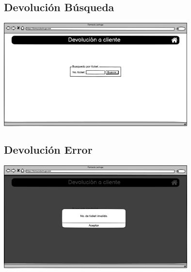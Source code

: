 \begin{flushleft}
	\subsection{Devolución Búsqueda} \label{UI: devolucion busqueda}
	\begin{center}
		\includegraphics[width=10cm]{pantallas/images/19devolucionbusqueda.png}\\	
		 	
	\end{center}
	\subsection{Devolución Error} \label{UI: devolucion error}
	\begin{center}
		\includegraphics[width=10cm]{pantallas/images/20devolucionerror.png}\\	
		 	
	\end{center}

\end{flushleft}
